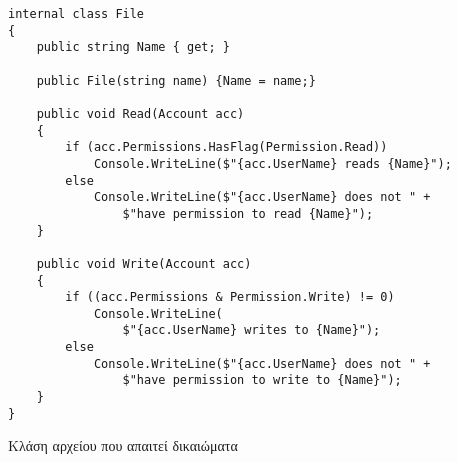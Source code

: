 \begin{listing}[H]
\begin{verbatim}
internal class File
{
    public string Name { get; }

    public File(string name) {Name = name;}
    
    public void Read(Account acc)
    {
        if (acc.Permissions.HasFlag(Permission.Read))
            Console.WriteLine($"{acc.UserName} reads {Name}");
        else
            Console.WriteLine($"{acc.UserName} does not " +
                $"have permission to read {Name}");
    }

    public void Write(Account acc)
    {
        if ((acc.Permissions & Permission.Write) != 0)
            Console.WriteLine(
                $"{acc.UserName} writes to {Name}");
        else
            Console.WriteLine($"{acc.UserName} does not " +
                $"have permission to write to {Name}");
    }
}
\end{verbatim}
\caption{Κλάση αρχείου που απαιτεί δικαιώματα}
\label{flagFile}
\end{listing}